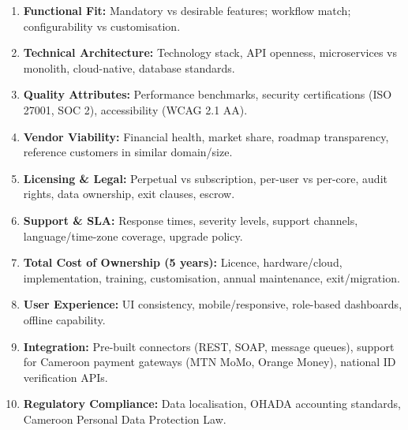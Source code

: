 \documentclass[11pt]{article}
\begin{document}
\begin{definition}
\begin{enumerate}
\item \textbf{Functional Fit:} Mandatory vs desirable features; workflow match; configurability vs customisation.
\item \textbf{Technical Architecture:} Technology stack, API openness, microservices vs monolith, cloud-native, database standards.
\item \textbf{Quality Attributes:} Performance benchmarks, security certifications (ISO 27001, SOC 2), accessibility (WCAG 2.1 AA).
\item \textbf{Vendor Viability:} Financial health, market share, roadmap transparency, reference customers in similar domain/size.
\item \textbf{Licensing \& Legal:} Perpetual vs subscription, per-user vs per-core, audit rights, data ownership, exit clauses, escrow.
\item \textbf{Support \& SLA:} Response times, severity levels, support channels, language/time-zone coverage, upgrade policy.
\item \textbf{Total Cost of Ownership (5 years):} Licence, hardware/cloud, implementation, training, customisation, annual maintenance, exit/migration.
\item \textbf{User Experience:} UI consistency, mobile/responsive, role-based dashboards, offline capability.
\item \textbf{Integration:} Pre-built connectors (REST, SOAP, message queues), support for Cameroon payment gateways (MTN MoMo, Orange Money), national ID verification APIs.
\item \textbf{Regulatory Compliance:} Data localisation, OHADA accounting standards, Cameroon Personal Data Protection Law.
\end{enumerate}
\end{definition}
\end{document}
